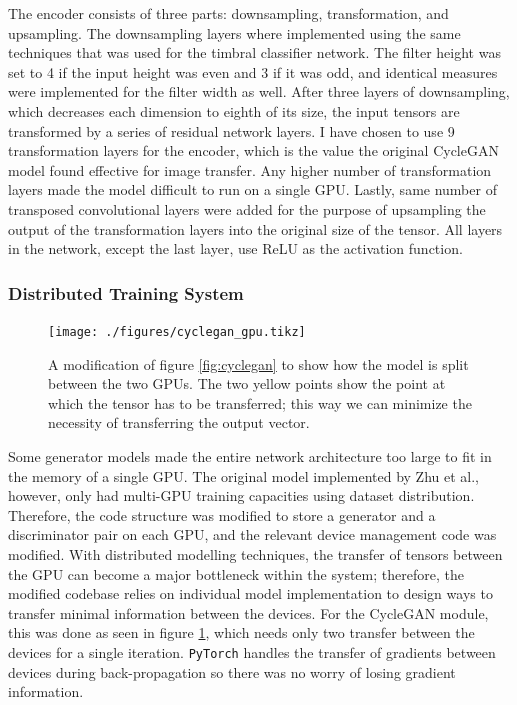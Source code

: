 \documentclass[12pt,a4paper,]{report}
\begin{document}
The encoder consists of three parts: downsampling, transformation, and
upsampling. The downsampling layers where implemented using the same
techniques that was used for the timbral classifier network. The filter
height was set to 4 if the input height was even and 3 if it was odd,
and identical measures were implemented for the filter width as well.
After three layers of downsampling, which decreases each dimension to
eighth of its size, the input tensors are transformed by a series of
residual network layers. I have chosen to use 9 transformation layers
for the encoder, which is the value the original CycleGAN model found
effective for image transfer. Any higher number of transformation layers
made the model difficult to run on a single GPU. Lastly, same number of
transposed convolutional layers were added for the purpose of upsampling
the output of the transformation layers into the original size of the
tensor. All layers in the network, except the last layer, use ReLU as
the activation function.

\hypertarget{distributed-training-system}{%
\subsubsection{Distributed Training
System}\label{distributed-training-system}}

\begin{figure}[h]
    \texttt{[image: ./figures/cyclegan\_gpu.tikz]}
    \centering
    \caption{A modification of figure \ref{fig:cyclegan} to show how the model is split between the two GPUs. The two yellow points show the point at which the tensor has to be transferred; this way we can minimize the necessity of transferring the output vector.} \label{fig:cyclegan_gpu}
\end{figure}

Some generator models made the entire network architecture too large to
fit in the memory of a single GPU. The original model implemented by Zhu
et al., however, only had multi-GPU training capacities using dataset
distribution. Therefore, the code structure was modified to store a
generator and a discriminator pair on each GPU, and the relevant device
management code was modified. With distributed modelling techniques, the
transfer of tensors between the GPU can become a major bottleneck within
the system; therefore, the modified codebase relies on individual model
implementation to design ways to transfer minimal information between
the devices. For the CycleGAN module, this was done as seen in figure
\ref{fig:cyclegan_gpu}, which needs only two transfer between the
devices for a single iteration. \texttt{PyTorch} handles the transfer of
gradients between devices during back-propagation so there was no worry
of losing gradient information.
\end{document}
